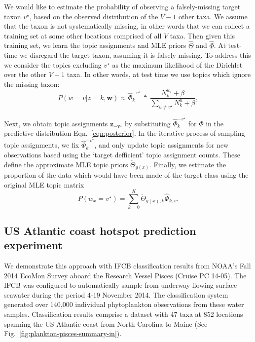 We would like to estimate the probability of observing a falsely-missing target taxon $v^\star$, based on the observed distribution of the $V-1$ other taxa.
We assume that the taxon is not systematically missing, in other words that we can collect a training set at some other locations comprised of all $V$ taxa.
Then given this training set, we learn the topic assignments and MLE priors $\hat{\Theta}$ and $\hat{\Phi}$. At test-time we disregard the target taxon, assuming it is falsely-missing. To address this we consider the topics excluding $v^\star$ as the maximum likelihood of the Dirichlet over the other $V-1$ taxa. In other words, at test time we use topics which ignore the missing taxon:
\begin{equation}
P(w = v | z = k, \boldsymbol{w}) \approx \hat{\Phi}_k^{-v^\star} \triangleq \frac{N^{w_i}_k + \beta}{\sum_{u \neq v^\star} N^u_k + \beta},
\end{equation}

Next, we obtain topic assignments $\boldsymbol{z_{- v^\star}}$ by substituting $\hat{\Phi}_k^{- v^\star}$ for $\Phi$ in the predictive distribution Eqn.~\ref{eqn:posterior}. In the iterative process of sampling topic assignments, we fix $\hat{\Phi}_k^{-v^\star}$, and only update topic assignments for new observations based using the `target defficient' topic assignment counts. These define the approximate MLE topic priors $\check{\Theta}_{g(x)}$. Finally, we estimate the proportion of the data which would have been made of the target class using the original MLE topic matrix
\begin{equation}
P(w_x = v^\star) = \sum_{k=0}^K \check{\Theta}_{g(x),k} \hat{\Phi}_{k,v^\star}
\end{equation}

\subsection{US Atlantic coast hotspot prediction experiment}

We demonstrate this approach with IFCB classification results from NOAA's Fall 2014 EcoMon Survey aboard the Research Vessel Pisces (Cruise PC 14-05). The IFCB was configured to automatically sample from underway flowing surface seawater during the period 4-19 November 2014. The classification system generated over 140,000 individual phytoplankton observations from these water samples. Classification results comprise a dataset with 47 taxa at 852 locations spanning the US Atlantic coast from North Carolina to Maine (See Fig.~\ref{fig:plankton-pisces-summary-in}).

